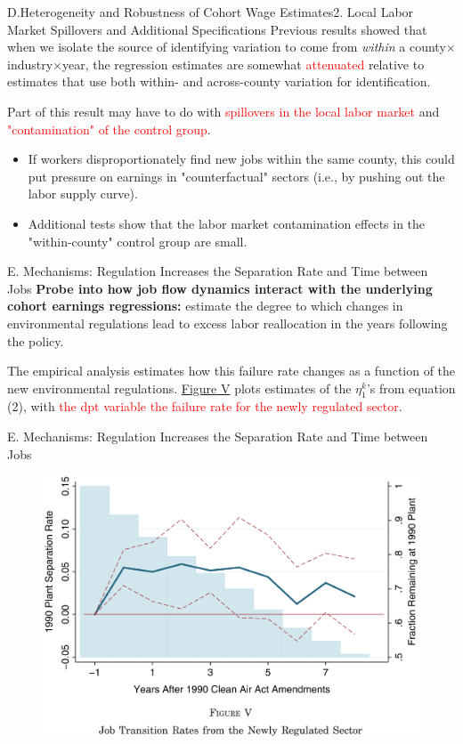 \documentclass{beamer}
\begin{document}
\begin{frame}{D.Heterogeneity and Robustness of Cohort Wage Estimates}{2. Local Labor Market Spillovers and Additional Specifications}
	Previous results showed that when we isolate the source of identifying variation to come from \textit{within} a county$\times$industry$\times$year, the regression estimates are somewhat \textcolor{red}{attenuated} relative to estimates that use both within- and across-county variation for identification.
	\medskip

	Part of this result may have to do with \textcolor{red}{spillovers in the local labor market} and \textcolor{red}{"contamination" of the control group}.
	\begin{itemize}
		\item If workers disproportionately find new jobs within the same county, this could put pressure on earnings in "counterfactual" sectors (i.e., by pushing out the labor supply curve).
		\item Additional tests show that the labor market contamination effects in the "within-county" control group are small.
	\end{itemize}
\end{frame}
\begin{frame}{E. Mechanisms: Regulation Increases the Separation Rate and Time between Jobs}
	\textbf{Probe into how job flow dynamics interact with the underlying cohort earnings regressions:} estimate the degree to which changes in environmental regulations lead to excess labor reallocation in the years following the policy.
	\medskip

	The empirical analysis estimates how this failure rate changes as a function of the new environmental regulations. \textcolor{blue}{\hyperlink{figure5}{Figure V}} plots estimates of the $\eta_1^k$'s from equation (2), with \textcolor{red}{the dpt variable the failure rate for the newly regulated sector}.
\end{frame}
\begin{frame}[label=figure5]{E. Mechanisms: Regulation Increases the Separation Rate and Time between Jobs}
	\begin{figure}[h]
		\centering
		\includegraphics[scale=0.35]{figure5.png}
	\end{figure}
\end{frame}
\end{document}
